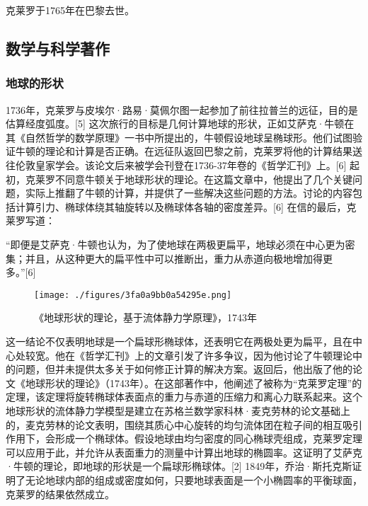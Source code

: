克莱罗于1765年在巴黎去世。
\subsection{数学与科学著作}  
\subsubsection{地球的形状}  
1736年，克莱罗与皮埃尔·路易·莫佩尔图一起参加了前往拉普兰的远征，目的是估算经度弧度。[5] 这次旅行的目标是几何计算地球的形状，正如艾萨克·牛顿在其《自然哲学的数学原理》一书中所提出的，牛顿假设地球呈椭球形。他们试图验证牛顿的理论和计算是否正确。在远征队返回巴黎之前，克莱罗将他的计算结果送往伦敦皇家学会。该论文后来被学会刊登在1736-37年卷的《哲学汇刊》上。[6] 起初，克莱罗不同意牛顿关于地球形状的理论。在这篇文章中，他提出了几个关键问题，实际上推翻了牛顿的计算，并提供了一些解决这些问题的方法。讨论的内容包括计算引力、椭球体绕其轴旋转以及椭球体各轴的密度差异。[6] 在信的最后，克莱罗写道：

“即便是艾萨克·牛顿也认为，为了使地球在两极更扁平，地球必须在中心更为密集；并且，从这种更大的扁平性中可以推断出，重力从赤道向极地增加得更多。”[6]
\begin{figure}[ht]
\centering
\texttt{[image: ./figures/3fa0a9bb0a54295e.png]}
\caption{《地球形状的理论，基于流体静力学原理》，1743年} \label{fig_Alexis_2}
\end{figure}
这一结论不仅表明地球是一个扁球形椭球体，还表明它在两极处更为扁平，且在中心处较宽。他在《哲学汇刊》上的文章引发了许多争议，因为他讨论了牛顿理论中的问题，但并未提供太多关于如何修正计算的解决方案。返回后，他出版了他的论文《地球形状的理论》（1743年）。在这部著作中，他阐述了被称为“克莱罗定理”的定理，该定理将旋转椭球体表面点的重力与赤道的压缩力和离心力联系起来。这个地球形状的流体静力学模型是建立在苏格兰数学家科林·麦克劳林的论文基础上的，麦克劳林的论文表明，围绕其质心中心旋转的均匀流体团在粒子间的相互吸引作用下，会形成一个椭球体。假设地球由均匀密度的同心椭球壳组成，克莱罗定理可以应用于此，并允许从表面重力的测量中计算出地球的椭圆率。这证明了艾萨克·牛顿的理论，即地球的形状是一个扁球形椭球体。[2] 1849年，乔治·斯托克斯证明了无论地球内部的组成或密度如何，只要地球表面是一个小椭圆率的平衡球面，克莱罗的结果依然成立。

